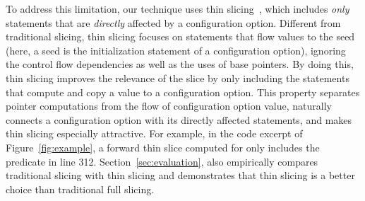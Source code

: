

To address this limitation, our technique uses thin
slicing~\cite{Sridharan:2007}, which includes
\textit{only} statements that are \textit{directly} affected by a configuration option.
Different from traditional slicing, thin slicing
focuses on statements that flow values to the seed (here, a
seed is the initialization statement of a configuration option), ignoring the 
control flow dependencies as well as the uses of
base pointers. By doing this, thin slicing improves the relevance
of the slice by only including the statements that compute
and copy a value to a configuration option.
This property separates
pointer computations from the flow of configuration option value,
naturally connects a configuration option with its
directly affected statements, and makes thin slicing
especially attractive.
For example, in the code excerpt of Figure~\ref{fig:example},
a forward thin slice computed for 
only includes the predicate in line 312.
Section~\ref{sec:evaluation}, 
also empirically compares traditional slicing with
thin slicing and demonstrates that thin slicing is a better choice
than traditional full slicing.




% 

